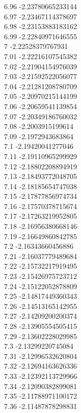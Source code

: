 {6.96	-2.23780665233144\\
6.97	-2.23467114378697\\
6.98	-2.23153883183162\\
6.99	-2.22840971646555\\
7	-2.22528379767931\\
7.01	-2.22216107545382\\
7.02	-2.21904154976039\\
7.03	-2.21592522056077\\
7.04	-2.21281208780709\\
7.05	-2.20970215144199\\
7.06	-2.20659541139854\\
7.07	-2.20349186760032\\
7.08	-2.2003915199614\\
7.09	-2.1972943683864\\
7.1	-2.19420041277046\\
7.11	-2.19110965299929\\
7.12	-2.18802208894919\\
7.13	-2.18493772048705\\
7.14	-2.18185654747038\\
7.15	-2.17877856974734\\
7.16	-2.17570378715674\\
7.17	-2.17263219952805\\
7.18	-2.16956380668146\\
7.19	-2.16649860842785\\
7.2	-2.16343660456886\\
7.21	-2.16037779489684\\
7.22	-2.15732217919495\\
7.23	-2.15426975723712\\
7.24	-2.15122052878809\\
7.25	-2.14817449360343\\
7.26	-2.14513165142955\\
7.27	-2.14209200200374\\
7.28	-2.13905554505415\\
7.29	-2.13602228029985\\
7.3	-2.13299220745084\\
7.31	-2.12996532620804\\
7.32	-2.12694163626336\\
7.33	-2.12392113729966\\
7.34	-2.12090382899081\\
7.35	-2.11788971100172\\
7.36	-2.11487878298831\\
}
